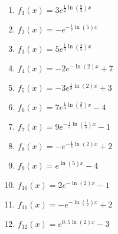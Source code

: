 \begin{Answer}[ref=eFktFGlAA1]

	\begin{minipage}{\textwidth}
		\begin{minipage}[t]{0.5\textwidth}
			\begin{enumerate}[label=\alph*)]
				\item \(f_1(x)=3e^{\frac{1}{2}\ln\left(\frac{8}{3}\right)x}\)
				\item \(f_2(x)=-e^{-\frac{1}{2}\ln\left(5\right)x}\)
				\item \(f_3(x)=5e^{\frac{1}{3}\ln\left(\frac{4}{5}\right)x}\)
				\item \(f_4(x)=-2e^{-\ln(2)x}+7\)
				\item \(f_5(x)=-3e^{\frac{1}{3}\ln\left(2\right)x}+3\)
				\item \(f_6(x)=7e^{\frac{1}{4}\ln\left(\frac{2}{7}\right)x}-4\)
			\end{enumerate}
		\end{minipage}%
		\begin{minipage}[t]{0.5\textwidth}
			\begin{enumerate}[label=\alph*)]
				\setcounter{enumi}{6}
				\item \(f_7(x)=9e^{-\frac{1}{5}\ln\left(\frac{1}{3}\right)x}-1\)
				\item \(f_8(x)=-e^{-\frac{1}{5}\ln\left(2\right)x}+2\)
				\item \(f_9(x)=e^{\ln(5)x}-4\)
				\item \(f_{10}(x)=2e^{-\ln(2)x}-1\)
				\item \(f_{11}(x)=-e^{-\ln\left(\frac{1}{2}\right)x}+2\)
				\item \(f_{12}(x)=e^{0,5\ln(2)x}-3\)
			\end{enumerate}
		\end{minipage}%
	\end{minipage}
\end{Answer}